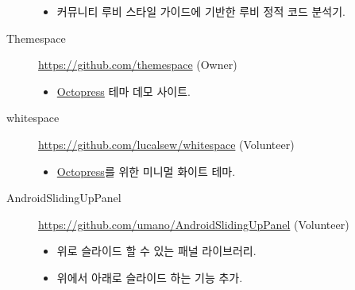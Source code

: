 \documentclass[a4paper,10pt]{article}
\begin{document}
\begin{description}
\begin{itemize}
      \item 커뮤니티 루비 스타일 가이드에 기반한 루비 정적 코드 분석기.
    \end{itemize}
  \item[Themespace] \url{https://github.com/themespace} (Owner)
    \begin{itemize}
      \item \href{http://octopress.org}{Octopress} 테마 데모 사이트.
    \end{itemize}
  \item[whitespace] \url{https://github.com/lucalsew/whitespace} (Volunteer)
    \begin{itemize}
      \item \href{http://octopress.org}{Octopress}를 위한 미니멀 화이트 테마.
    \end{itemize}
  \item[AndroidSlidingUpPanel] \url{https://github.com/umano/AndroidSlidingUpPanel} (Volunteer)
    \begin{itemize}
      \item 위로 슬라이드 할 수 있는 패널 라이브러리.
      \item 위에서 아래로 슬라이드 하는 기능 추가.
    \end{itemize}
\end{description}


\end{document}
